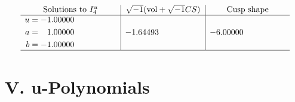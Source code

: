 \documentclass[1p]{elsarticle_modified}
\theoremstyle{definition}
\newcommand{\I}{\sqrt{-1}}
\begin{document}
$$\begin{array}{c|c|c}  
\text{Solutions to }I^u_{4}& \I (\text{vol} + \sqrt{-1}CS) & \text{Cusp shape}\\
 \hline 
\begin{aligned}
u &= -1.00000\phantom{ +0.000000I} \\
a &= \phantom{-}1.00000\phantom{ +0.000000I} \\
b &= -1.00000\phantom{ +0.000000I}\end{aligned}
 & -1.64493\phantom{ +0.000000I} & -6.00000\phantom{ +0.000000I}\\
 \hline 
 \end{array}$$\newpage
\newpage\renewcommand{\arraystretch}{1}
\centering \section*{ V. u-Polynomials}
\end{document}
